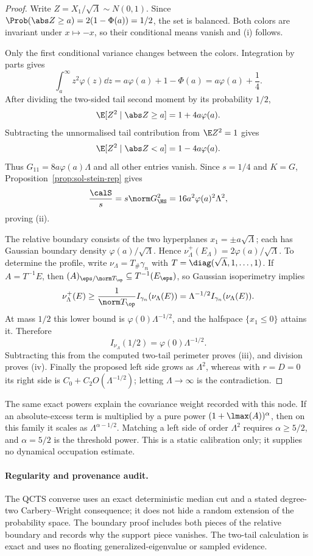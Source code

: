 \documentclass[../main.tex]{subfiles}
\begin{document}
\begin{proof}
Write $Z=X_1/\sqrt\Lambda\sim N(0,1)$.  Since
$\Prob(\abs Z\ge a)=2(1-\Phi(a))=1/2$, the set is balanced.  Both colors are invariant under
$x\mapsto-x$, so their conditional means vanish and (i) follows.

Only the first conditional variance changes between the colors.  Integration by parts gives
\[
 \int_a^\infty z^2\varphi(z)\dd z=a\varphi(a)+1-\Phi(a)
 =a\varphi(a)+\frac14.
\]
After dividing the two-sided tail second moment by its probability $1/2$,
\[
 \E[Z^2\mid\abs Z\ge a]=1+4a\varphi(a).
\]
Subtracting the unnormalised tail contribution from $\E Z^2=1$ gives
\[
 \E[Z^2\mid\abs Z<a]=1-4a\varphi(a).
\]
Thus $G_{11}=8a\varphi(a)\Lambda$ and all other entries vanish.  Since $s=1/4$ and $K=G$,
Proposition~\ref{prop:sol-stein-rep} gives
\[
 \frac{\calS}s=s\norm G_\HS^2=16a^2\varphi(a)^2\Lambda^2,
\]
proving (ii).

The relative boundary consists of the two hyperplanes
$x_1=\pm a\sqrt\Lambda$; each has Gaussian boundary density
$\varphi(a)/\sqrt\Lambda$.  Hence
$\nu_\Lambda^+(E_\Lambda)=2\varphi(a)/\sqrt\Lambda$.
To determine the profile, write $\nu_\Lambda=T_\#\gamma_n$ with
$T=\diag(\sqrt\Lambda,1,\ldots,1)$.  If $A=T^{-1}E$, then
$(A)_{\eps/\norm T_\op}\subseteq T^{-1}(E_\eps)$, so Gaussian isoperimetry implies
\[
 \nu_\Lambda^+(E)\ge\frac1{\norm T_\op}I_{\gamma_n}(\nu_\Lambda(E))
 =\Lambda^{-1/2}I_{\gamma_n}(\nu_\Lambda(E)).
\]
At mass $1/2$ this lower bound is $\varphi(0)\Lambda^{-1/2}$, and the halfspace
$\{x_1\le0\}$ attains it.  Therefore
\[
 I_{\nu_\Lambda}(1/2)=\varphi(0)\Lambda^{-1/2}.
\]
Subtracting this from the computed two-tail perimeter proves (iii), and division proves (iv).
Finally the proposed left side grows as $\Lambda^2$, whereas with $r=D=0$ its right side is
$C_0+C_2O(\Lambda^{-1/2})$; letting $\Lambda\to\infty$ is the contradiction.
\end{proof}

The same exact powers explain the covariance weight recorded with this node.  If an
absolute-excess term is multiplied by a pure power $(1+\lmax(A))^\alpha$, then on this family
it scales as $\Lambda^{\alpha-1/2}$.  Matching a left side of order $\Lambda^2$ requires
$\alpha\ge5/2$, and $\alpha=5/2$ is the threshold power.  This is a static calibration only;
it supplies no dynamical occupation estimate.

\paragraph{Regularity and provenance audit.}
The QCTS converse uses an exact deterministic median cut and a stated degree-two
Carbery--Wright consequence; it does not hide a random extension of the probability space.
The boundary proof includes both pieces of the relative boundary and records why the support
piece vanishes.  The two-tail calculation is exact and uses no floating generalized-eigenvalue
or sampled evidence.
\end{document}
